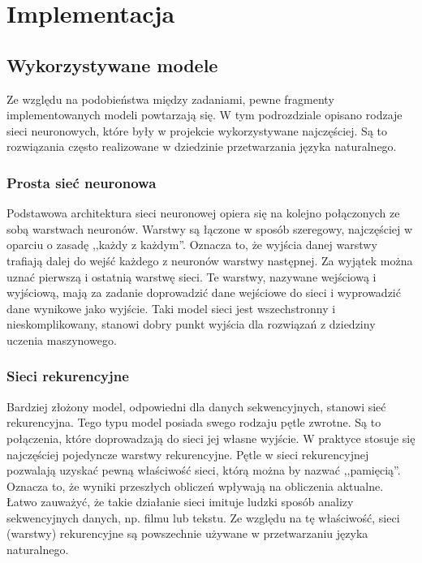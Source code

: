 \chapter{Implementacja}

\section{Wykorzystywane modele}
Ze względu na podobieństwa między zadaniami, pewne fragmenty implementowanych modeli powtarzają się. W tym podrozdziale opisano rodzaje sieci neuronowych, które były w projekcie wykorzystywane najczęściej. Są to rozwiązania często realizowane w dziedzinie przetwarzania języka naturalnego.

\subsection{Prosta sieć neuronowa}
Podstawowa architektura sieci neuronowej opiera się na kolejno połączonych ze sobą warstwach neuronów. Warstwy są łączone w sposób szeregowy, najczęściej w oparciu o zasadę ,,każdy z każdym''. Oznacza to, że wyjścia danej warstwy trafiają dalej do wejść każdego z neuronów warstwy następnej. Za wyjątek można uznać pierwszą i ostatnią warstwę sieci. Te warstwy, nazywane wejściową i wyjściową, mają za zadanie doprowadzić dane wejściowe do sieci i wyprowadzić dane wynikowe jako wyjście. Taki model sieci jest wszechstronny i nieskomplikowany, stanowi dobry punkt wyjścia dla rozwiązań z dziedziny uczenia maszynowego. 

\subsection{Sieci rekurencyjne}
Bardziej złożony model, odpowiedni dla danych sekwencyjnych, stanowi sieć rekurencyjna. Tego typu model posiada swego rodzaju pętle zwrotne. Są to połączenia, które doprowadzają do sieci jej własne wyjście. W praktyce stosuje się najczęściej pojedyncze warstwy rekurencyjne. Pętle w sieci rekurencyjnej pozwalają uzyskać pewną właściwość sieci, którą można by nazwać ,,pamięcią''. Oznacza to, że wyniki przeszłych obliczeń wpływają na obliczenia aktualne. Łatwo zauważyć, że takie działanie sieci imituje ludzki sposób analizy sekwencyjnych danych, np. filmu lub tekstu. Ze względu na tę właściwość, sieci (warstwy) rekurencyjne są powszechnie używane w przetwarzaniu języka naturalnego.


